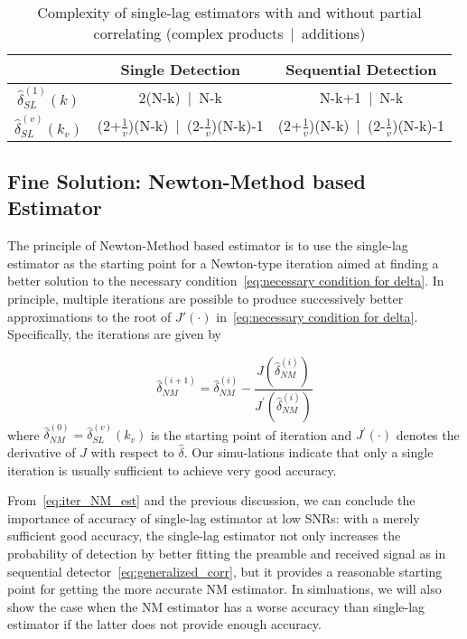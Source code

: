\begin{table}[t]
  \caption{Complexity of single-lag estimators with and without partial correlating (complex products~|~additions)}  %
  \centering 
  \begin{tabular}{c c c} 
  \hline\hline 
   & Single Detection & Sequential Detection \\ [0.5ex] 
  \hline 
  $\hat{\delta}_{SL}^{(1)}(k)$  & 2(N-k)~|~N-k & N-k+1~|~N-k \\ 
  $\hat{\delta}_{SL}^{(v)}(k_v)$ & (2+$\frac{1}{v}$)(N-k)~|~(2-$\frac{1}{v}$)(N-k)-1 & (2+$\frac{1}{v}$)(N-k)~|~(2-$\frac{1}{v}$)(N-k)-1 \\ [1ex]
  \hline
  \end{tabular}
  \label{table:computational complexity comparison}
\end{table}

\subsection{Fine Solution: Newton-Method based Estimator}

The principle of Newton-Method based estimator is to use the single-lag estimator as the starting point for a Newton-type iteration 
aimed at finding a better solution to the necessary condition~\eqref{eq:necessary condition for delta}. 
In principle, multiple iterations are possible to produce successively better approximations to the root of
$J'(\cdot)$ in~\eqref{eq:necessary condition for delta}. Specifically, the iterations are given by

\begin{equation}
  \label{eq:iter_NM_est}
  \hat{\delta}_{NM}^{(i+1)}=\hat{\delta}_{NM}^{(i)}-
  \frac{J(\hat{\delta}_{NM}^{(i)})}{J^\prime(\hat{\delta}_{NM}^{(i)})}
\end{equation}
where $\hat{\delta}_{NM}^{(0)}=\hat{\delta}^{(v)}_{SL}(k_v)$ is the starting point of iteration and
$J^\prime(\cdot)$ denotes the derivative of $J$ with respect to $\hat{\delta}$. 
Our simu-lations indicate that only a single iteration is usually sufficient to achieve very good accuracy.

From~\eqref{eq:iter_NM_est} and the previous discussion, we can conclude the importance of accuracy of single-lag estimator
at low SNRs: 
with a merely sufficient good accuracy, the single-lag estimator not only increases the probability of detection by better
fitting the preamble and received signal as in sequential detector~\eqref{eq:generalized_corr}, but 
it provides a reasonable starting point for getting the more accurate NM estimator. In simluations,
we will also show the case when the NM estimator has a worse accuracy than single-lag estimator if the latter does not provide enough accuracy. 


